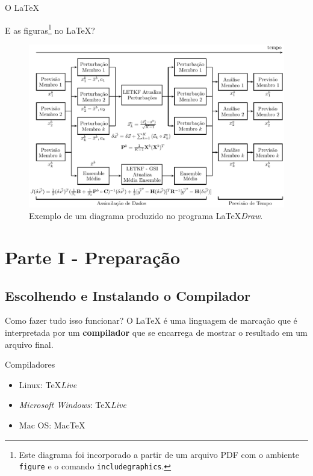 \documentclass[10pt]{beamer}
\begin{document}
\begin{frame}{O \LaTeX{}}
	\begin{block}{E as figuras\footnote{{\scriptsize Este diagrama foi incorporado a partir de um arquivo PDF com o ambiente {\tt figure} e o comando {\tt includegraphics}.}} no \LaTeX{}?}
    \vspace{-0.5em}
		\begin{figure}
				\includegraphics[scale=0.5]{./figs/diagrama_hibrido_novo_pt-tempos.pdf}
				\caption{Exemplo de um diagrama produzido no programa \LaTeX\textit{Draw}.}
		\end{figure}
	\end{block}
\end{frame}

\section{Parte I - Preparação}

\subsection{Escolhendo e Instalando o Compilador}

\begin{frame}{Como fazer tudo isso funcionar?}
O \LaTeX{} é uma linguagem de marcação que é interpretada por um \textbf{compilador} que se encarrega de mostrar o resultado em um arquivo final.
    \pause
	\begin{block}{Compiladores}
		\begin{itemize}
			\item Linux: \TeX{}\textit{Live}
			\item \textit{Microsoft Windows}: \TeX{}\textit{Live}
			\item Mac OS: Mac\TeX{}
		\end{itemize}
	\end{block}
\end{frame}
\end{document}
